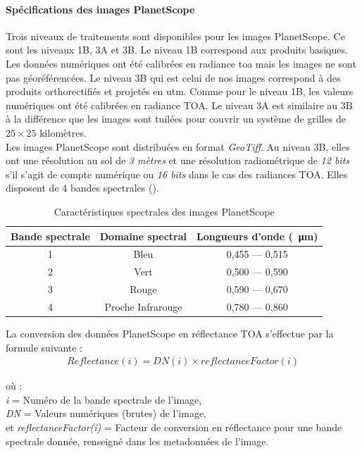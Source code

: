     \paragraph{Spécifications des images PlanetScope}

Trois niveaux de traitements sont disponibles pour les images PlanetScope. Ce sont les niveaux 1B, 3A et 3B. Le niveau 1B correspond aux produits basiques. Les données numériques ont 
été calibrées en radiance \acrshort{toa} mais les images ne sont pas géoréférencées. Le niveau 3B qui est celui de nos images correspond à des produits orthorectifiés et projetés en
\acrshort{utm}. Comme pour le niveau 1B, les valeurs numériques ont été calibrées en radiance TOA. Le niveau 3A est similaire au 3B à la différence que les images sont tuilées pour 
couvrir un système de grilles de $25\times25$ kilomètres.\\
Les images PlanetScope sont distribuées en format \emph{GeoTiff}. Au niveau 3B, elles ont une résolution au sol de \emph{3 mètres} et une résolution radiométrique de \emph{12 bits} s'il 
s'agit de compte numérique ou \emph{16 bits} dans le cas des radiances TOA. Elles disposent de 4 bandes spectrales (). 

\begin{table}[htbp]
\begin{center}
\caption{Caractéristiques spectrales des images PlanetScope}
\label{tab-planetscope}
 \begin{tabular}{ccc}
  \hline
  Bande spectrale & Domaine spectral & Longueurs d'onde (\SI{}{\micro\meter})\\
  \hline
  1 & Bleu & 0,455 --- 0,515 \\
  2 & Vert & 0,500 --- 0,590 \\
  3 & Rouge & 0,590 --- 0,670 \\
  4 & Proche Infrarouge & 0,780 --- 0,860 \\ 
  \hline
 \end{tabular}
\end{center}
\end{table}

La conversion des données PlanetScope en réflectance TOA s'effectue par la formule suivante :
\begin{align}
   Reflectance (i) = DN(i) \times reflectanceFactor(i)
\end{align}

où :\\
\emph{i} = Numéro de la bande spectrale de l'image,\\
\emph{DN} = Valeurs numériques (brutes) de l'image,\\
et \emph{reflectanceFactor(i)} = Facteur de conversion en réflectance pour une bande spectrale donnée, renseigné dans les metadonnées de l'image.

